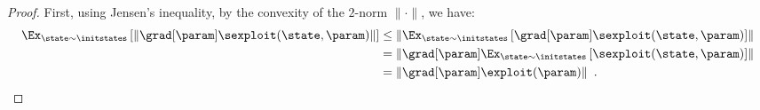 \lemmafullsupport*
\begin{proof}



    First, using Jensen's inequality, by the convexity of the $2$-norm $\| \cdot \|$, we have: 
    \begin{align*}
    \Ex_{\state \sim \initstates} \left[ \| \grad[\param] \sexploit (\state, \param) \| \right] 
    &\leq \left\| \Ex_{\state \sim \initstates} \left[ \grad[\param] \sexploit (\state, \param) \right] \right\| \, \\
    &= \left\|   \grad[\param] \Ex_{\state \sim \initstates} \left[\sexploit (\state, \param) \right] \right\| \, \\
    &= \| \grad[\param] \exploit (\param) \|  \enspace .   
    \end{align*}
    

\end{proof}
